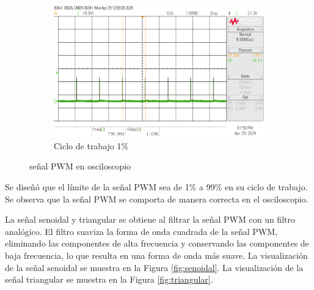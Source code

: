 \documentclass{article}
\begin{document}
\begin{figure}[H]
\begin{subfigure}{.3\textwidth}
        \centering
        \includegraphics[width=\linewidth]{images/scope_3.png}
        \caption{Ciclo de trabajo 1\%}
        \label{fig:pwm_3}
    \end{subfigure}
    \caption{señal PWM en osciloscopio}
    \label{fig:osciloscopio}
\end{figure}
Se diseñó que el límite de la señal PWM sea de 1\% a 99\% en su ciclo de trabajo. Se observa que la señal PWM se comporta de manera correcta en el osciloscopio.

La señal senoidal y triangular se obtiene al filtrar la señal PWM con un filtro analógico.
El filtro suaviza la forma de onda cuadrada de la señal PWM, eliminando las componentes de alta frecuencia y conservando las componentes de baja frecuencia, lo que resulta en una forma de onda más suave.
La visualización de la señal senoidal se muestra en la Figura \ref{fig:senoidal}. 
La visualización de la señal triangular se muestra en la Figura \ref{fig:triangular}.
\end{document}
